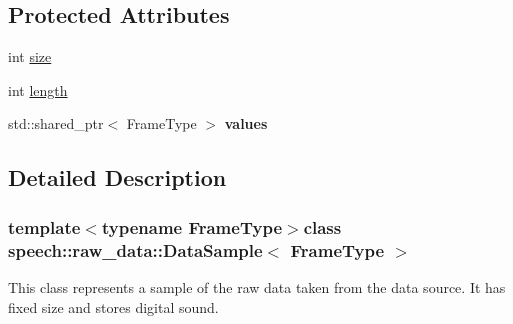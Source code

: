 \subsection*{Protected Attributes}
\begin{DoxyCompactItemize}
\item 
int \hyperlink{classspeech_1_1raw__data_1_1DataSample_a07f56392e007247976f6ab8c2c4edb95}{size}
\item 
int \hyperlink{classspeech_1_1raw__data_1_1DataSample_aeecd9add20856d81b34085090ef19d49}{length}
\item 
\hypertarget{classspeech_1_1raw__data_1_1DataSample_a2b0871621ea7280a83907eecee7d9817}{std\+::shared\+\_\+ptr$<$ Frame\+Type $>$ {\bfseries values}}\label{classspeech_1_1raw__data_1_1DataSample_a2b0871621ea7280a83907eecee7d9817}

\end{DoxyCompactItemize}


\subsection{Detailed Description}
\subsubsection*{template$<$typename Frame\+Type$>$class speech\+::raw\+\_\+data\+::\+Data\+Sample$<$ Frame\+Type $>$}

This class represents a sample of the raw data taken from the data source. It has fixed size and stores digital sound. 

